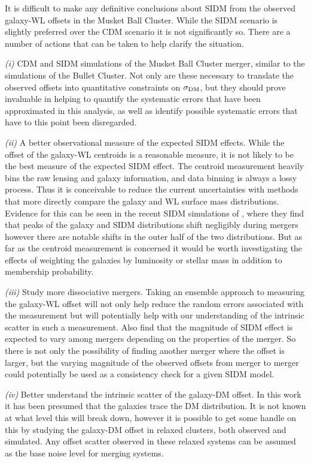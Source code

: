 It is difficult to make any definitive conclusions about SIDM from the observed galaxy-WL offsets in the Musket Ball Cluster.
While the SIDM scenario is slightly preferred over the CDM scenario it is not significantly so.
There are a number of actions that can be taken to help clarify the situation.

\textit{(i)} CDM and SIDM simulations of the Musket Ball Cluster merger, similar to the \citet{Randall:2008hs} simulations of the Bullet Cluster.
Not only are these necessary to translate the observed offsets into quantitative constraints on $\sigma_{\rm DM}$, but they should prove invaluable in helping to quantify the systematic errors that have been approximated in this analysis, as well as identify possible systematic errors that have to this point been disregarded.

\textit{(ii)} A better observational measure of the expected SIDM effects.
While the offset of the galaxy-WL centroids is a reasonable measure, it is not likely to be the best measure of the expected SIDM effect.
The centroid measurement heavily bins the raw lensing and galaxy information, and data binning is always a lossy process.
Thus it is conceivable to reduce the current uncertainties with methods that more directly compare the galaxy and WL surface mass distributions.
Evidence for this can be seen in the recent SIDM simulations of \citet{Kahlhoefer:2013wp}, where they find that peaks of the galaxy and SIDM distributions shift  negligibly during mergers however there are notable shifts in the outer half of the  two distributions.
But as far as the centroid measurement is concerned it would be worth investigating the effects of weighting the galaxies by luminosity or stellar mass in addition to membership probability.

\textit{(iii)} Study more dissociative mergers.
Taking an ensemble approach to measuring the galaxy-WL offset will not only help reduce the random errors associated with the measurement but will potentially help with our understanding of the intrinsic scatter in such a measurement.
Also \citet{Kahlhoefer:2013wp} find that the magnitude of SIDM effect is expected to vary among mergers depending on the properties of the merger.
So there is not only the possibility of finding another merger where the offset is larger, but the varying magnitude of the observed offsets from merger to merger could potentially be used as a consistency check for a given SIDM model.

\textit{(iv)} Better understand the intrinsic scatter of the galaxy-DM offset.
In this work it has been presumed that the galaxies trace the DM distribution. 
It is not known at what level this will break down, however it is possible to get some handle on this by studying the galaxy-DM offset in relaxed clusters, both observed and simulated.
Any offset scatter observed in these relaxed systems can be assumed as the base noise level for merging systems.

